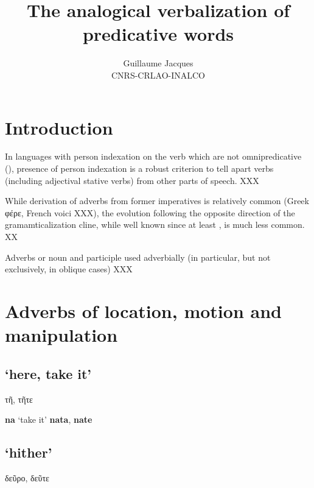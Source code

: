 \documentclass[11pt]{article}
\newcommand{\ipa}[1]{{\phon\textbf{#1}}}
\newcommand{\grec}[1]{{\mleccha #1}}
\begin{document}
 
\title{The analogical verbalization of predicative words}
\author{Guillaume Jacques\\ CNRS-CRLAO-INALCO}
\maketitle

\section*{Introduction}



In languages with person indexation on the verb which are not omnipredicative (\citealt{launey94}), presence of person indexation is a robust criterion to tell apart verbs (including adjectival stative verbs) from other parts of speech. XXX


While derivation of adverbs from former imperatives is relatively common (Greek \grec{φέρε}, French voici XXX), the evolution following the opposite direction of the gramamticalization cline, while well known since at least \citet[414]{pott1859}, is much less common. XX


Adverbs or noun and participle used adverbially (in particular, but not exclusively, in oblique cases) XXX

\section{Adverbs of location, motion and manipulation}

\subsection{`here, take it'}
\citet[114]{viti15wandel}
\grec{τῆ}, \grec{τῆτε}

\citet[156]{miklosisch1883}
\ipa{na} `take it' \ipa{nata}, \ipa{nate}


\subsection{`hither'}

\grec{δεῦρο}, \grec{δεῦτε}
\end{document}
